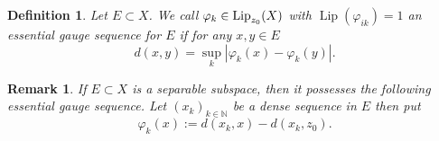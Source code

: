\documentclass[reqno]{amsart}
\newtheorem{defn}[thm]{Definition}
\newtheorem{rem}[thm]{Remark}
\begin{document}



\begin{defn}
Let $E\subset X$. 
We call $\varphi_k\in \textnormal{Lip}_{z_0}(X)$ with $\operatorname{Lip}(\varphi_{ik})=1$
an essential gauge sequence for $E$ if 
for any $x,y\in E$
\[
d(x, y) = \sup_{k} |\varphi_k(x) - \varphi_k(y)|.
\]
\end{defn}
\begin{rem}\label{rem:essgauge-sep}
If $E\subset X$ is a separable subspace, then it possesses the following essential gauge sequence.
Let $(x_k)_{k\in\mathbb N}$ be a dense sequence in $E$
then put
\[
\varphi_k(x):= d(x_k, x) - d(x_k,z_0).
\]
\end{rem}
\end{document}
